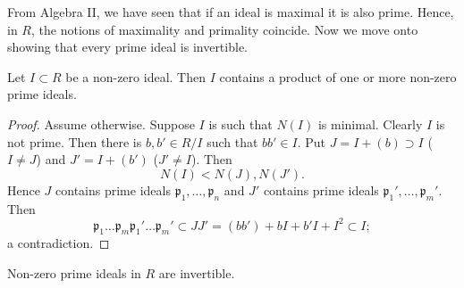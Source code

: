 From Algebra II, we have seen that if an ideal is maximal it is also prime.
Hence, in $R$, the notions of maximality and primality coincide.
Now we move onto showing that every prime ideal is invertible.

\begin{lemma}[]
	Let $I \subset R$ be a non-zero ideal.
	Then $I$ contains a product of one or more non-zero prime ideals.
\end{lemma}

\begin{proof}
	Assume otherwise.
	Suppose $I$ is such that $N(I)$ is minimal.
	Clearly $I$ is not prime.
	Then there is $b, b' \in R/I$ such that $bb' \in I$.
	Put $J = I + (b) \supset I$ ($I \neq J$) and
	$J' = I + (b')$ ($J' \neq I$).
	Then 
	\[
		N(I) < N(J), N(J').
	\]
	Hence $J$ contains prime ideals $\mathfrak p_1, \ldots, \mathfrak p_n$
	and $J'$ contains prime ideals $\mathfrak p_1', \ldots, \mathfrak p_m'$.
	Then 
	\[
		\mathfrak p_1 \ldots \mathfrak p_m \mathfrak p_1' \ldots \mathfrak p_m'
		\subset JJ' = (bb') + bI + b'I + I^2
		\subset I;
	\]
	a contradiction.
\end{proof}

\begin{theorem}[]
	Non-zero prime ideals in $R$ are invertible.
\end{theorem}

